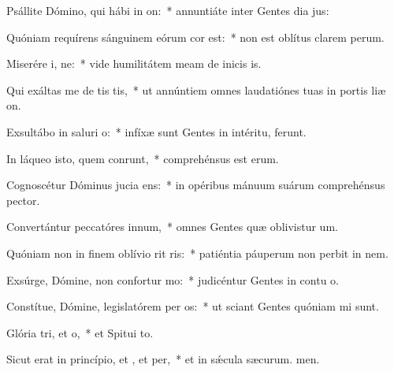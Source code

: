 \item Psállite Dómino, qui hábi in on:~* annuntiáte inter Gentes dia jus:
\item Quóniam requírens sánguinem eórum cor est:~* non est oblítus clarem perum.
\item Miserére i, ne:~* vide humilitátem meam de inicis is.
\item Qui exáltas me de tis tis,~* ut annúntiem omnes laudatiónes tuas in portis liæ on.
\item Exsultábo in saluri o:~* infíxæ sunt Gentes in intéritu,  ferunt.
\item In láqueo isto, quem conrunt,~* comprehénsus est  erum.
\item Cognoscétur Dóminus jucia ens:~* in opéribus mánuum suárum comprehénsus  pector.
\item Convertántur peccatóres  innum,~* omnes Gentes quæ oblivistur um.
\item Quóniam non in finem oblívio rit ris:~* patiéntia páuperum non perbit in nem.
\item Exsúrge, Dómine, non confortur mo:~* judicéntur Gentes in contu o.
\item Constítue, Dómine, legislatórem per os:~* ut sciant Gentes quóniam mi sunt.
\item Glória tri, et o,~* et Spitui to.
\item Sicut erat in princípio, et , et per,~* et in sǽcula sæcurum. men.
